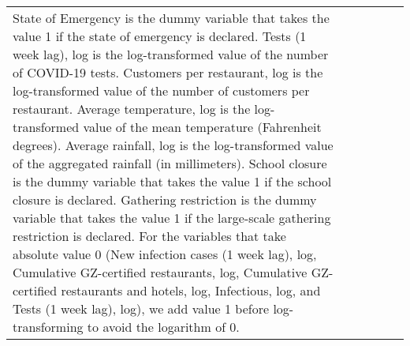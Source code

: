 \begin{table}[H]
\begin{tabular}{@{\extracolsep{1pt}}lccccc}
{{State of Emergency is the dummy variable that takes the value 1 if the state of emergency is declared. 
Tests (1 week lag), log is the log-transformed value of the number of COVID-19 tests.
Customers per restaurant, log is the log-transformed value of the number of customers per restaurant.
Average temperature, log is the log-transformed value of the mean temperature (Fahrenheit degrees).
Average rainfall, log is the log-transformed value of the aggregated rainfall (in millimeters).
School closure is the dummy variable that takes the value 1 if the school closure is declared. 
Gathering restriction is the dummy variable that takes the value 1 if the large-scale gathering restriction is declared.
For the variables that take absolute value 0 (New infection cases (1 week lag), log, Cumulative GZ-certified restaurants, log, Cumulative GZ-certified restaurants and hotels, log, Infectious, log, and Tests (1 week lag), log), we add value 1 before log-transforming to avoid the logarithm of 0.}} \\
\end{tabular} 
\end{table} 
